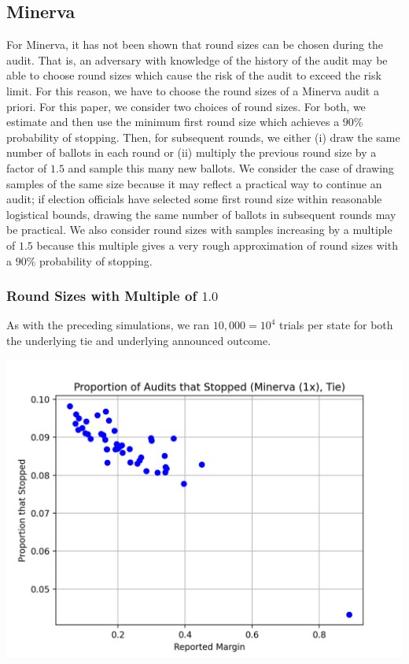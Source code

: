 \documentclass{article}
\begin{document}
\subsection{Minerva}
For Minerva, it has not been shown that round sizes can be chosen
during the audit. That is, an adversary with knowledge of the history
of the audit may be able to choose round sizes which cause the 
risk of the audit to exceed the risk limit.
For this reason, we have to choose the round sizes of a Minerva 
audit a priori.
For this paper, we consider two choices of round sizes.
For both, we estimate and then use the minimum first round size 
which achieves
a $90\%$ probability of stopping.
Then, for subsequent rounds, we either (i) 
draw the same number of ballots in each round or (ii)
multiply the previous round size by a factor of $1.5$ and 
sample this many new ballots.
We consider the case of drawing samples of the same size
because it may reflect a practical way to continue an
audit; if election officials have selected some first round size within
reasonable logistical bounds, drawing the same number of 
ballots in subsequent rounds may be practical.
We also consider round sizes with samples increasing by a multiple
of $1.5$ because this multiple gives a very rough approximation of 
round sizes with a $90\%$ probability of stopping.

\subsubsection{Round Sizes with Multiple of $1.0$}

As with the preceding simulations, we ran $10,000=10^4$ trials
per state for both the underlying tie and underlying announced
outcome.

\includegraphics[scale=.7]{minerva_multiround_1x_10^4/total_risk.png}
\end{document}
